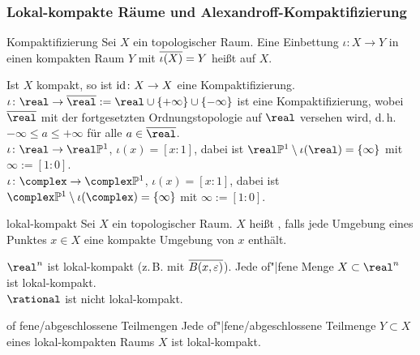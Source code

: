 \subsubsection{%
    Lokal-kompakte Räume und Alexandroff-Kompaktifizierung%
}

\begin{Def}{Kompaktifizierung}
    Sei $X$ ein topologischer Raum.
    Eine Einbettung $\iota\colon X \rightarrow Y$ in einen kompakten
    Raum $Y$ mit $\overline{\iota(X)} = Y$
    heißt  auf $X$.
\end{Def}

\begin{Bsp}
    Ist $X$ kompakt, so ist $\operatorname{id}\colon X \rightarrow X$ eine
    Kompaktifizierung. \\
    $\iota\colon \real \rightarrow \overline{\real} :=
    \real \cup \{+\infty\} \cup \{-\infty\}$ ist eine Kompaktifizierung, wobei
    $\overline{\real}$ mit der fortgesetzten Ordnungstopologie auf $\real$
    versehen wird, d.\,h. $-\infty \le a \le +\infty$ für alle
    $a \in \overline{\real}$. \\
    $\iota\colon \real \rightarrow \real\projective^1$, $\iota(x) = [x:1]$,
    dabei ist $\real\projective^1 \setminus \iota(\real) = \{\infty\}$ mit
    $\infty := [1:0]$. \\
    $\iota\colon \complex \rightarrow \complex\projective^1$,
    $\iota(x) = [x:1]$,
    dabei ist $\complex\projective^1 \setminus \iota(\complex) = \{\infty\}$
    mit $\infty := [1:0]$.
\end{Bsp}

\linie

\begin{Def}{lokal-kompakt}
    Sei $X$ ein topologischer Raum.
    $X$ heißt , falls jede Umgebung eines Punktes
    $x \in X$ eine kompakte Umgebung von $x$ enthält.
\end{Def}

\begin{Bsp}
    $\real^n$ ist lokal-kompakt (z.\,B. mit
    $\overline{B(x, \varepsilon)}$).
    Jede of"|fene Menge $X \subset \real^n$ ist lokal-kompakt. \\
    $\rational$ ist nicht lokal-kompakt.
\end{Bsp}

\begin{Satz}{of \!\!fene/abgeschlossene Teilmengen}
    Jede of"|fene/abgeschlossene Teilmenge $Y \subset X$
    eines lokal-kompakten Raums $X$ ist lokal-kompakt.
\end{Satz}

